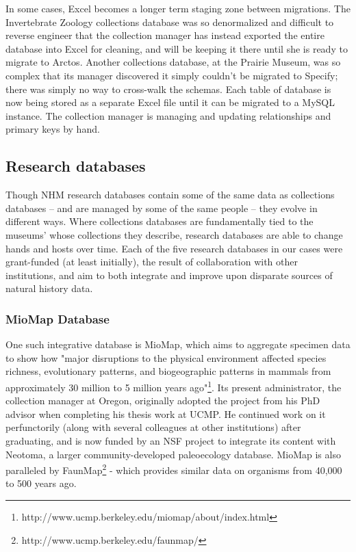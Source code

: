 In some cases, Excel becomes a longer term staging zone between migrations. The Invertebrate Zoology collections database was so denormalized and difficult to reverse engineer that the collection manager has instead exported the entire database into Excel for cleaning, and will be keeping it there until she is ready to migrate to Arctos. Another collections database, at the Prairie Museum, was so complex that its manager discovered it simply couldn't be migrated to Specify; there was simply no way to cross-walk the schemas. Each table of database is now being stored as a separate Excel file until it can be migrated to a MySQL instance. The collection manager is managing and updating relationships and primary keys by hand. 

\subsection{ Research databases} 

Though NHM research databases contain some of the same data as collections databases -- and are managed by some of the same people -- they evolve in different ways. Where collections databases are fundamentally tied to the museums' whose collections they describe, research databases are able to change hands and hosts over time. Each of the five research databases in our cases were grant-funded (at least initially), the result of collaboration with other institutions, and aim to both integrate and improve upon disparate sources of natural history data. 

\subsubsection{MioMap Database}
One such integrative database is MioMap, which aims to aggregate specimen data to show how "major disruptions to the physical environment affected species richness, evolutionary patterns, and biogeographic patterns in mammals from approximately 30 million to 5 million years ago"\footnote{http://www.ucmp.berkeley.edu/miomap/about/index.html}. Its present administrator, the collection manager at Oregon, originally adopted the project from his PhD advisor when completing his thesis work at UCMP. He continued work on it perfunctorily (along with several colleagues at other institutions) after graduating, and is now funded by an NSF project to integrate its content with Neotoma, a larger community-developed paleoecology database. MioMap is also paralleled by FaunMap\footnote{http://www.ucmp.berkeley.edu/faunmap/} - which provides similar data on organisms from 40,000 to 500 years ago.

